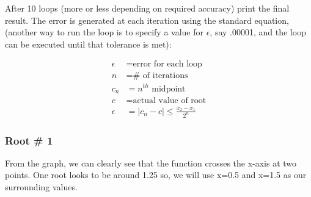 \documentclass[11pt]{article}
\begin{document}
After 10 loops (more or less depending on required accuracy) print the
final result. The error is generated at each iteration using the
standard equation, (another way to run the loop is to specify a value
for \(\epsilon\), say .00001, and the loop can be executed until that
tolerance is met):

    \[\begin{align*}\epsilon &= \text{error for each loop} \\
 n &= \text{# of iterations} \\
 c_{n} &= n^{th}\text{ midpoint} \\
 c &= \text{actual value of root} \\
\epsilon &= \left | c_{n} - c \right | \leq \frac{x_{2} - x_{1}}{2^{n}}
\end{align*}\]

    \subsubsection{Root \# 1}\label{root-1}

From the graph, we can clearly see that the function crosses the x-axis
at two points. One root looks to be around 1.25 so, we will use x=0.5
and x=1.5 as our surrounding values.
\end{document}
